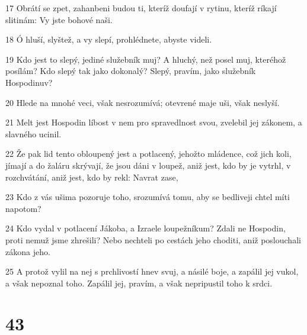 \par 17 Obrátí se zpet, zahanbeni budou ti, kteríž doufají v rytinu, kteríž ríkají slitinám: Vy jste bohové naši.
\par 18 Ó hluší, slyštež, a vy slepí, prohlédnete, abyste videli.
\par 19 Kdo jest to slepý, jediné služebník muj? A hluchý, než posel muj, kteréhož posílám? Kdo slepý tak jako dokonalý? Slepý, pravím, jako služebník Hospodinuv?
\par 20 Hlede na mnohé veci, však nesrozumívá; otevrené maje uši, však neslyší.
\par 21 Melt jest Hospodin líbost v nem pro spravedlnost svou, zvelebil jej zákonem, a slavného ucinil.
\par 22 Že pak lid tento obloupený jest a potlacený, jehožto mládence, což jich koli, jímají a do žaláru skrývají, že jsou dáni v loupež, aniž jest, kdo by je vytrhl, v rozchvátání, aniž jest, kdo by rekl: Navrat zase,
\par 23 Kdo z vás ušima pozoruje toho, srozumívá tomu, aby se bedliveji chtel míti napotom?
\par 24 Kdo vydal v potlacení Jákoba, a Izraele loupežníkum? Zdali ne Hospodin, proti nemuž jsme zhrešili? Nebo nechteli po cestách jeho choditi, aniž poslouchali zákona jeho.
\par 25 A protož vylil na nej s prchlivostí hnev svuj, a násilé boje, a zapálil jej vukol, a však nepoznal toho. Zapálil jej, pravím, a však nepripustil toho k srdci.

\chapter{43}

